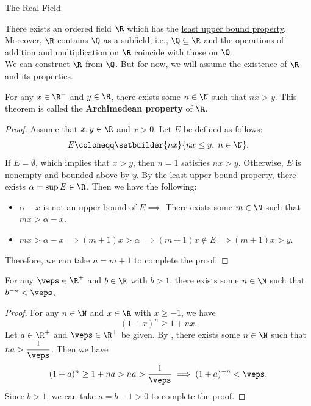 \begin{section}{The Real Field}

There exists an ordered field $\R$ which has the \hyperref[def:LeastUpperBoundProperty]{least upper bound property}.
Moreover, $\R$ contains $\Q$ as a subfield, i.e., $\Q \subseteq \R$ and the operations of addition and multiplication
on $\R$ coincide with those on $\Q$.
\\[3mm]
We can construct $\R$ from $\Q$. But for now, we will assume the existence of $\R$ and its properties.

\bigskip

\begin{theorem} \label{thm:ArchimedeanProperty}
    For any $x\in \R^{+}$ and $y \in \R$, there exists some $n \in \N$ such that $nx > y$.
    This theorem is called the \textbf{Archimedean property} of $\R$.
\end{theorem}

\begin{proof}
    Assume that $x, y \in \R$ and $x > 0$. Let $E$ be defined as follows:
    \[
    E \coloneqq \setbuilder{nx}{nx \leq y, \; n \in \N}.
    \]
    If $E = \emptyset$, which implies that $x > y$, then $n = 1$ satisfies $nx > y$. Otherwise, $E$ is nonempty and bounded
    above by $y$. By the least upper bound property, there exists $\alpha = \sup E \in \R$. Then we have the following:
    \begin{itemize}
        \item $\alpha - x$ is not an upper bound of $E \implies$ There exists some $m \in \N$ such that $mx > \alpha - x$.
        \item $mx > \alpha - x \implies (m + 1)x > \alpha \implies (m + 1)x \notin E \implies (m + 1)x > y$.
    \end{itemize}
    Therefore, we can take $n = m + 1$ to complete the proof.
\end{proof}

\bigskip

\begin{corollary} \label{cor:ArchimedeanPropertyCorollary}
    For any $\veps \in \R^{+}$ and $b \in \R$ with $b > 1$, there exists some $n \in \N$ such that $b^{-n} < \veps$.
\end{corollary}

\begin{proof}
    For any $n \in \N$ and $x \in \R$ with $x \geq -1$, we have
    \[
    (1 + x)^{n} \geq 1 + nx.
    \]
    Let $a \in \R^{+}$ and $\veps \in \R^{+}$ be given. By ,
    there exists some $n \in \N$ such that $na > \dfrac{1}{\veps}$. Then we have
    \[
    (1 + a)^{n} \geq 1 + na > na > \frac{1}{\veps} \implies (1 + a)^{-n} < \veps.
    \]
    Since $b > 1$, we can take $a = b - 1 > 0$ to complete the proof.
\end{proof}


\end{section}
